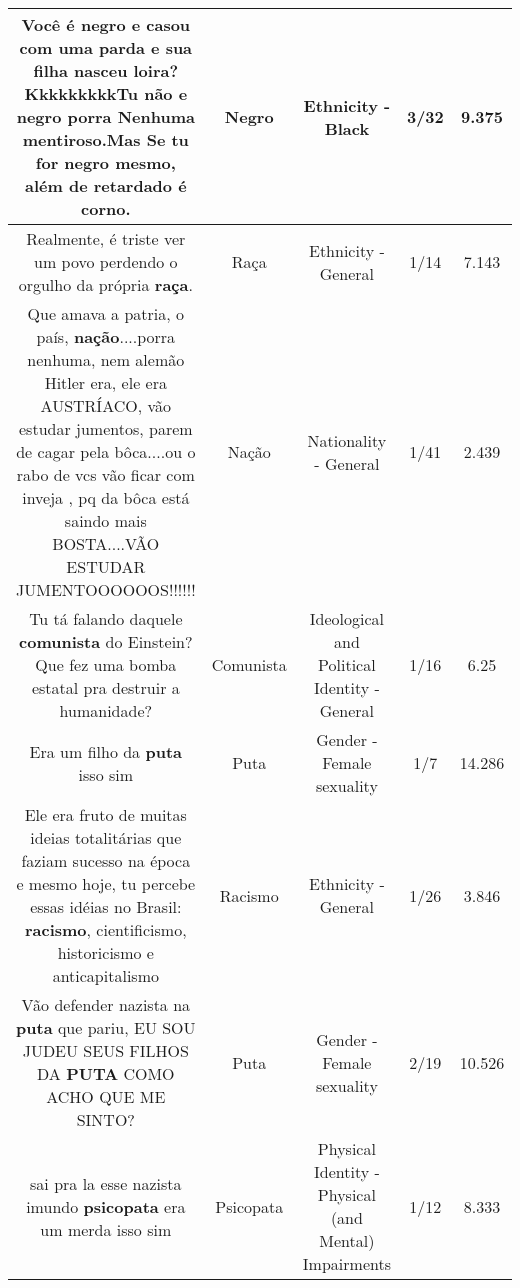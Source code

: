 \documentclass[11pt]{article}
\newlength\mylength
\begin{document}
\begin{center}
\begin{longtable}{|C{.65\mylength}|C{.30\mylength}|C{.12\mylength}|C{.12\mylength}|C{.12\mylength}|}
  \small Você é \textbf{negro} e casou com uma parda e sua filha nasceu loira? KkkkkkkkkTu não e \textbf{negro} porra Nenhuma mentiroso.Mas Se tu for \textbf{negro} mesmo, além de retardado é corno.\normalsize   & Negro & Ethnicity - Black & 3/32 & 9.375 \\  \hline
  \small {} Realmente, é triste ver um povo perdendo o orgulho da própria \textbf{raça}.\normalsize   & Raça & Ethnicity - General & 1/14 & 7.143 \\  \hline
  \small Que amava a  patria, o país,  \textbf{nação}....porra nenhuma, nem alemão Hitler era,  ele era AUSTRÍACO, vão  estudar jumentos, parem de cagar pela bôca....ou o rabo de vcs vão  ficar com inveja , pq da bôca está  saindo mais BOSTA....VÃO  ESTUDAR JUMENTOOOOOOS!!!!!!\normalsize   & Nação & Nationality - General & 1/41 & 2.439 \\  \hline
  \small Tu tá falando daquele \textbf{comunista} do Einstein? Que fez uma bomba estatal pra destruir a humanidade?\normalsize   & Comunista & Ideological and Political Identity - General & 1/16 & 6.25 \\  \hline
  \small Era um filho da \textbf{puta} isso sim\normalsize   & Puta & Gender - Female sexuality & 1/7 & 14.286 \\  \hline
  \small Ele era fruto de muitas ideias totalitárias que faziam sucesso na época e mesmo hoje, tu percebe essas idéias no Brasil: \textbf{racismo}, cientificismo, historicismo e anticapitalismo\normalsize   & Racismo & Ethnicity - General & 1/26 & 3.846 \\  \hline
  \small Vão defender nazista na \textbf{puta} que pariu, EU SOU JUDEU SEUS FILHOS DA \textbf{PUTA} COMO ACHO QUE ME SINTO?\normalsize   & Puta & Gender - Female sexuality & 2/19 & 10.526 \\  \hline
  \small sai pra la esse nazista imundo \textbf{psicopata} era um merda isso sim\normalsize   & Psicopata & Physical Identity - Physical (and Mental) Impairments & 1/12 & 8.333 \\  \hline

\end{longtable}
\end{center}
\end{document}
